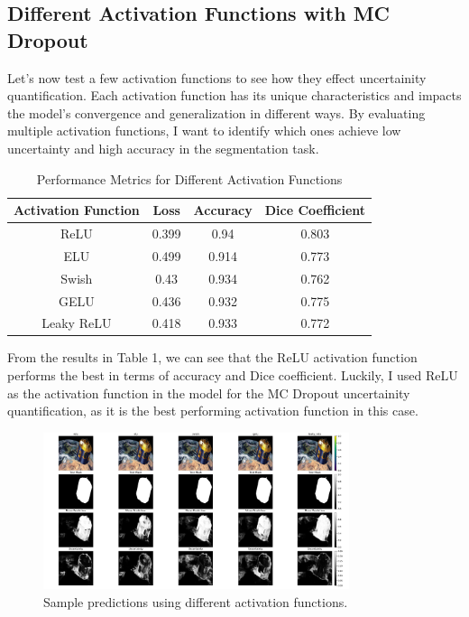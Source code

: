 \documentclass{article}
\begin{document}
\subsection{Different Activation Functions with MC Dropout}

Let's now test a few activation functions to see how they effect uncertainity quantification. Each activation function has 
its unique characteristics and impacts the model's convergence and generalization in different ways. By evaluating multiple 
activation functions, I want to identify which ones achieve low uncertainty and high accuracy in the segmentation task.

\begin{table}[h!]
    \centering
    \begin{tabular}{|c|c|c|c|}
        \hline
        \textbf{Activation Function} & \textbf{Loss} & \textbf{Accuracy} & \textbf{Dice Coefficient} \\
        \hline
        ReLU & 0.399 & 0.94 & 0.803 \\
        \hline
        ELU & 0.499 & 0.914 & 0.773 \\
        \hline
        Swish & 0.43 & 0.934 & 0.762 \\
        \hline
        GELU & 0.436 & 0.932 & 0.775 \\
        \hline
        Leaky ReLU & 0.418 & 0.933 & 0.772 \\
        \hline
    \end{tabular}
    \caption{Performance Metrics for Different Activation Functions}
    \label{tab:activation_functions}
\end{table}

From the results in Table 1, we can see that the ReLU activation function performs the best in terms of accuracy and Dice coefficient.  
Luckily, I used ReLU as the activation function in the model for the MC Dropout uncertainity quantification, as it is 
the best performing activation function in this case.

\begin{figure}[h]
    \centering
    \includegraphics[width=0.8\textwidth]{../images/activation_funcs/activation_funcs_predictions.png}
    \caption{Sample predictions using different activation functions.}
    \label{fig:activation_functions_predictions}
\end{figure}
\vspace{1em}
\end{document}
